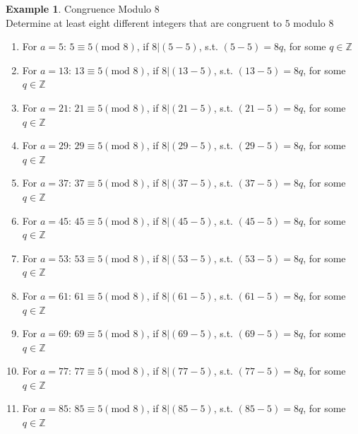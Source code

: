 \documentclass{book}
\theoremstyle{definition}
\newtheorem{example}{Example}[definition]
\theoremstyle{remark}
\newcommand{\bb}[1]{\mathbb{#1}}
\begin{document}
\begin{example}
Congruence Modulo 8 \cite[Chap.3, P.C.3.4, Q.1-2]{ted} \\

Determine at least eight different integers that are congruent to $5$ modulo $8$ \\

\begin{enumerate}
    \item For $a = 5$: $5 \equiv 5(\text{mod } 8)$, if $8 | (5 - 5)$, s.t. $(5-5) = 8q$, for some $q \in \bb{Z}$ \\
    \item For $a = 13$: $13 \equiv 5(\text{mod } 8)$, if $8 | (13 - 5)$, s.t. $(13-5) = 8q$, for some $q \in \bb{Z}$ \\
    \item For $a = 21$: $21 \equiv 5(\text{mod } 8)$, if $8 | (21 - 5)$, s.t. $(21-5) = 8q$, for some $q \in \bb{Z}$ \\
    \item For $a = 29$: $29 \equiv 5(\text{mod } 8)$, if $8 | (29 - 5)$, s.t. $(29-5) = 8q$, for some $q \in \bb{Z}$ \\
    \item For $a = 37$: $37 \equiv 5(\text{mod } 8)$, if $8 | (37 - 5)$, s.t. $(37-5) = 8q$, for some $q \in \bb{Z}$ \\
    \item For $a = 45$: $45 \equiv 5(\text{mod } 8)$, if $8 | (45 - 5)$, s.t. $(45-5) = 8q$, for some $q \in \bb{Z}$ \\
    \item For $a = 53$: $53 \equiv 5(\text{mod } 8)$, if $8 | (53 - 5)$, s.t. $(53-5) = 8q$, for some $q \in \bb{Z}$ \\
    \item For $a = 61$: $61 \equiv 5(\text{mod } 8)$, if $8 | (61 - 5)$, s.t. $(61-5) = 8q$, for some $q \in \bb{Z}$ \\
    \item For $a = 69$: $69 \equiv 5(\text{mod } 8)$, if $8 | (69 - 5)$, s.t. $(69-5) = 8q$, for some $q \in \bb{Z}$ \\
    \item For $a = 77$: $77 \equiv 5(\text{mod } 8)$, if $8 | (77 - 5)$, s.t. $(77-5) = 8q$, for some $q \in \bb{Z}$ \\
    \item For $a = 85$: $85 \equiv 5(\text{mod } 8)$, if $8 | (85 - 5)$, s.t. $(85-5) = 8q$, for some $q \in \bb{Z}$ \\
\end{enumerate}


\end{example}
\end{document}
